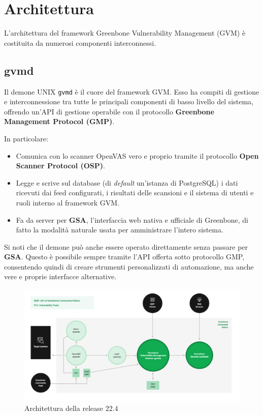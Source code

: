 \section{Architettura}
L'architettura del framework Greenbone Vulnerability Management (GVM) è costituita da numerosi componenti interconnessi.

\subsection{gvmd}
Il demone UNIX \texttt{gvmd} è il cuore del framework GVM. Esso ha compiti di gestione e interconnessione tra tutte le principali componenti di basso livello del sistema, offrendo un'API di gestione operabile con il protocollo \textbf{Greenbone Management Protocol (GMP)}.
\label{gmp}

In particolare:
\begin{itemize}
    \item Comunica con lo scanner OpenVAS vero e proprio tramite il protocollo \textbf{Open Scanner Protocol (OSP)}.
    \item Legge e scrive sul database (di \emph{default} un'istanza di PostgreSQL) i dati ricevuti dai feed configurati, i risultati delle scansioni e il sistema di utenti e ruoli interno al framework GVM.
    \item Fa da server per \textbf{GSA}, l'interfaccia web nativa e ufficiale di Greenbone, di fatto la modalità naturale usata per amministrare l'intero sistema.
\end{itemize}

Si noti che il demone può anche essere operato direttamente senza passare per \textbf{GSA}. Questo è possibile sempre tramite l'API offerta sotto protocollo GMP, consentendo quindi di creare strumenti personalizzati di automazione, ma anche vere e proprie interfacce alternative.

\begin{figure}
    \includegraphics[width=\textwidth]{img/greenbone-community-22.4-architecture.png}
    \caption{Architettura della release 22.4}
\end{figure}


